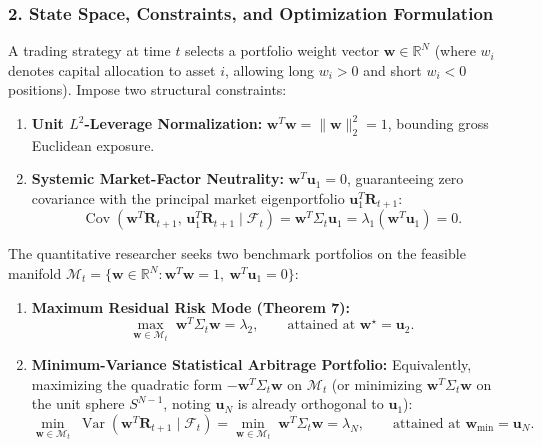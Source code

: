 \documentclass[11pt, letterpaper]{article}
\theoremstyle{definition}
\theoremstyle{remark}
\newcommand{\R}{\mathbb{R}}
\begin{document}
\subsubsection*{2. State Space, Constraints, and Optimization Formulation}
A trading strategy at time $t$ selects a portfolio weight vector $\mathbf{w} \in \R^N$ (where $w_i$ denotes capital allocation to asset $i$, allowing long $w_i > 0$ and short $w_i < 0$ positions). Impose two structural constraints:
\begin{enumerate}[label=(\roman*)]
    \item \textbf{Unit $L^2$-Leverage Normalization:} $\mathbf{w}^T \mathbf{w} = \|\mathbf{w}\|_2^2 = 1$, bounding gross Euclidean exposure.
    \item \textbf{Systemic Market-Factor Neutrality:} $\mathbf{w}^T \mathbf{u}_1 = 0$, guaranteeing zero covariance with the principal market eigenportfolio $\mathbf{u}_1^T \mathbf{R}_{t+1}$:
    \[
    \operatorname{Cov}(\mathbf{w}^T \mathbf{R}_{t+1},\, \mathbf{u}_1^T \mathbf{R}_{t+1} \mid \mathcal{F}_t) = \mathbf{w}^T \Sigma_t \mathbf{u}_1 = \lambda_1 (\mathbf{w}^T \mathbf{u}_1) = 0.
    \]
\end{enumerate}

The quantitative researcher seeks two benchmark portfolios on the feasible manifold $\mathcal{M}_t = \{\mathbf{w} \in \R^N : \mathbf{w}^T \mathbf{w} = 1,\ \mathbf{w}^T \mathbf{u}_1 = 0\}$:
\begin{enumerate}[label=\textbf{Problem \Alph*:}]
    \item \textbf{Maximum Residual Risk Mode (Theorem 7):}
    \[
    \max_{\mathbf{w} \in \mathcal{M}_t} \; \mathbf{w}^T \Sigma_t \mathbf{w} = \lambda_2, \qquad \text{attained at } \mathbf{w}^\star = \mathbf{u}_2.
    \]
    \item \textbf{Minimum-Variance Statistical Arbitrage Portfolio:}
    Equivalently, maximizing the quadratic form $-\mathbf{w}^T \Sigma_t \mathbf{w}$ on $\mathcal{M}_t$ (or minimizing $\mathbf{w}^T \Sigma_t \mathbf{w}$ on the unit sphere $S^{N-1}$, noting $\mathbf{u}_N$ is already orthogonal to $\mathbf{u}_1$):
    \[
    \min_{\mathbf{w} \in \mathcal{M}_t} \; \operatorname{Var}(\mathbf{w}^T \mathbf{R}_{t+1} \mid \mathcal{F}_t) = \min_{\mathbf{w} \in \mathcal{M}_t} \; \mathbf{w}^T \Sigma_t \mathbf{w} = \lambda_N, \qquad \text{attained at } \mathbf{w}_{\min} = \mathbf{u}_N.
    \]
\end{enumerate}
\end{document}
